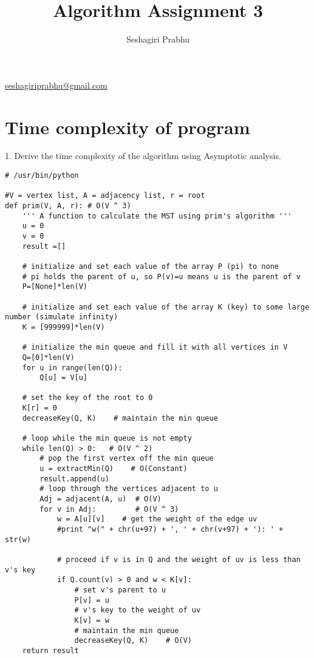 \documentclass{article}
\title{Algorithm Assignment 3}
\author{Seshagiri Prabhu}
\begin{document}
\maketitle
\begin{center}
\href{mailto:seshagiriprabhu@gmail.com}{seshagiriprabhu@gmail.com}
\end{center}
\date{}
\section{Time complexity of program}
1. Derive the time complexity of the algorithm using Asymptotic analysis.


\begin{lstlisting}
# /usr/bin/python

#V = vertex list, A = adjacency list, r = root
def prim(V, A, r): # O(V ^ 3)
    ''' A function to calculate the MST using prim's algorithm '''
    u = 0
    v = 0
    result =[]
    
    # initialize and set each value of the array P (pi) to none
    # pi holds the parent of u, so P(v)=u means u is the parent of v
    P=[None]*len(V)

    # initialize and set each value of the array K (key) to some large number (simulate infinity)
    K = [999999]*len(V)

    # initialize the min queue and fill it with all vertices in V
    Q=[0]*len(V)
    for u in range(len(Q)):
        Q[u] = V[u]

    # set the key of the root to 0
    K[r] = 0
    decreaseKey(Q, K)    # maintain the min queue

    # loop while the min queue is not empty
    while len(Q) > 0:	# O(V ^ 2)  
    	# pop the first vertex off the min queue 
        u = extractMin(Q)    # O(Constant)
        result.append(u)
        # loop through the vertices adjacent to u
        Adj = adjacent(A, u)  # O(V)
        for v in Adj:         # O(V ^ 3)
            w = A[u][v]    # get the weight of the edge uv
            #print "w(" + chr(u+97) + ', ' + chr(v+97) + '): ' + str(w)

            # proceed if v is in Q and the weight of uv is less than v's key
            if Q.count(v) > 0 and w < K[v]:
                # set v's parent to u
                P[v] = u
                # v's key to the weight of uv
                K[v] = w
                # maintain the min queue
                decreaseKey(Q, K)    # O(V)
    return result

\end{lstlisting}
\end{document}
